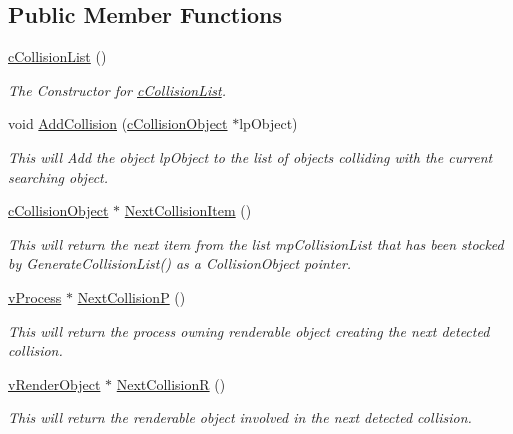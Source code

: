 \subsection*{Public Member Functions}
\begin{DoxyCompactItemize}
\item 
\hyperlink{classc_collision_list_a1b84b682ec105262682532b0a90754c2}{cCollisionList} ()
\begin{DoxyCompactList}\small\item\em The Constructor for \hyperlink{classc_collision_list}{cCollisionList}. \item\end{DoxyCompactList}\item 
void \hyperlink{classc_collision_list_ace525d10fc1a38477cee11e14714b476}{AddCollision} (\hyperlink{classc_collision_object}{cCollisionObject} $\ast$lpObject)
\begin{DoxyCompactList}\small\item\em This will Add the object lpObject to the list of objects colliding with the current searching object. \item\end{DoxyCompactList}\item 
\hyperlink{classc_collision_object}{cCollisionObject} $\ast$ \hyperlink{classc_collision_list_a52b7906c944e28ae8c97f93c81fb6d95}{NextCollisionItem} ()
\begin{DoxyCompactList}\small\item\em This will return the next item from the list mpCollisionList that has been stocked by GenerateCollisionList() as a CollisionObject pointer. \item\end{DoxyCompactList}\item 
\hyperlink{classv_process}{vProcess} $\ast$ \hyperlink{classc_collision_list_a58249799702049c2ca64bc60df20b596}{NextCollisionP} ()
\begin{DoxyCompactList}\small\item\em This will return the process owning renderable object creating the next detected collision. \item\end{DoxyCompactList}\item 
\hyperlink{classv_render_object}{vRenderObject} $\ast$ \hyperlink{classc_collision_list_a789c6669b21ab76af2cb9b8456d3e89a}{NextCollisionR} ()
\begin{DoxyCompactList}\small\item\em This will return the renderable object involved in the next detected collision. \item\end{DoxyCompactList}\item 

\end{DoxyCompactItemize}
